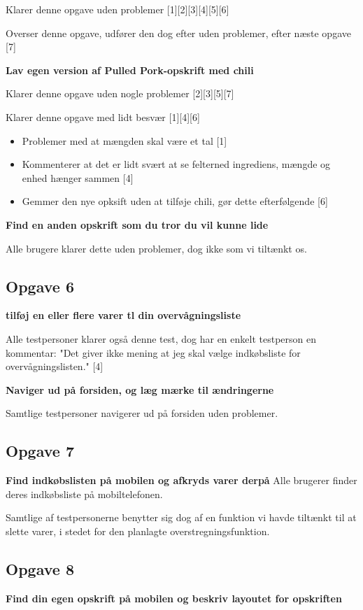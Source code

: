 Klarer denne opgave uden problemer [1][2][3][4][5][6]

Overser denne opgave, udfører den dog efter uden problemer, efter næste opgave [7]   

\textbf{Lav egen version af Pulled Pork-opskrift med chili}

Klarer denne opgave uden nogle problemer [2][3][5][7]

Klarer denne opgave med lidt besvær [1][4][6]
\begin{itemize}
	\item Problemer med at mængden skal være et tal [1]
	\item Kommenterer at det er lidt svært at se felterned ingrediens, mængde og enhed hænger sammen [4]
	\item Gemmer den nye opksift uden at tilføje chili, gør dette efterfølgende [6]
\end{itemize}

\textbf{Find en anden opskrift som du tror du vil kunne lide}

Alle brugere klarer dette uden problemer, dog ikke som vi tiltænkt os.

\subsection{Opgave 6}
\textbf{tilføj en eller flere varer tl din overvågningsliste}

Alle testpersoner klarer også denne test, dog har en enkelt testperson en kommentar: "Det giver ikke mening at jeg skal vælge indkøbsliste for overvågningslisten." [4] 

\textbf{Naviger ud på forsiden, og læg mærke til ændringerne}

Samtlige testpersoner navigerer ud på forsiden uden problemer.

\subsection{Opgave 7}
\textbf{Find indkøbslisten på mobilen og afkryds varer derpå}
Alle brugerer finder deres indkøbsliste på mobiltelefonen.

Samtlige af testpersonerne benytter sig dog af en funktion vi havde tiltænkt til at slette varer, i stedet for den planlagte overstregningsfunktion.

\subsection{Opgave 8}
\textbf{Find din egen opskrift på mobilen og beskriv layoutet for opskriften}

